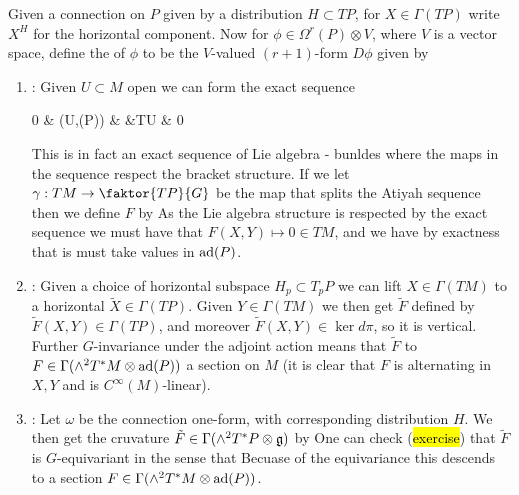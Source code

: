 \documentclass{article}
\begin{document}
\begin{definition}
	Given a connection on $P$ given by a distribution $H \subset TP$, for $X \in \Gamma(TP)$ write $X^H$ for the horizontal component. Now for $\phi \in \Omega^r(P) \otimes V$, where $V$ is a vector space, define the  of $\phi$ to be the $V$-valued $(r+1)$-form $D\phi$ given by
\end{definition}
\begin{enumerate}
	\item {}: Given $U\subset M$ open we can form the exact sequence 
	\begin{tkz}
		0 \arrow[r] & \Gamma(U,\ad(P)) \arrow[r] & \Gamma{} \arrow[r] &TU \arrow[r] & 0 
	\end{tkz}
This is in fact an exact sequence of Lie algebra - bunldes where the maps in the sequence respect the bracket structure. If we let $\gamma : TM \to \faktor{TP}{G}$ be the map that splits the Atiyah sequence then we define $F$ by 
As the Lie algebra structure is respected by the exact sequence we must have that $F(X,Y) \mapsto 0 \in TM$, and we have by exactness that is must take values in $\operatorname{ad}(P)$. 
	\item {}: Given a choice of horizontal subspace $H_p \subset T_pP$ we can lift $X \in \Gamma(TM)$ to a horizontal $\tilde{X} \in \Gamma(TP)$. Given $Y\in \Gamma(TM)$ we then get $\tilde{F}$ defined by 
$\tilde{F}(X,Y) \in \Gamma(TP)$, and moreover $\tilde{F}(X,Y) \in \ker d\pi$, so it is vertical. Further $G$-invariance under the adjoint action means that $\tilde{F}$ to $F \in \Gamma(\wedge^2 T^\ast M \otimes \operatorname{ad}(P))$ a section on $M$ (it is clear that $F$ is alternating in $X,Y$ and is $C^\infty(M)$-linear). 
	\item {}: Let $\omega$ be the connection one-form, with corresponding distribution $H$. We then get the cruvature $\tilde{F} \in \Gamma(\wedge^2 T^\ast P \otimes \mathfrak{g})$ by 
One can check (\hl{exercise}) that $\tilde{F}$ is $G$-equivariant in the sense that 
Becuase of the equivariance this descends to a section $F \in \Gamma(\wedge^2 T^\ast M \otimes \operatorname{ad}(P))$. 
\end{enumerate}
\end{document}
